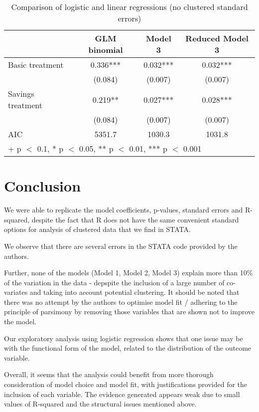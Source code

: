 \documentclass[
]{article}
\begin{document}
\begin{table}

\caption{\label{tab:parsimony}Comparison of logistic and linear regressions (no clustered standard errors)}
\centering
\begin{tabular}[t]{lccc}
\toprule
  & GLM binomial & Model 3 & Reduced Model 3\\
\midrule
Basic treatment & \num{0.336}*** & \num{0.032}*** & \num{0.032}***\\
 & (\num{0.084}) & (\num{0.007}) & \vphantom{1} (\num{0.007})\\
Savings treatment & \num{0.219}** & \num{0.027}*** & \num{0.028}***\\
 & (\num{0.084}) & (\num{0.007}) & (\num{0.007})\\
\midrule
AIC & \num{5351.7} & \num{1030.3} & \num{1031.8}\\
\bottomrule
\multicolumn{4}{l}{\rule{0pt}{1em}+ p $<$ 0.1, * p $<$ 0.05, ** p $<$ 0.01, *** p $<$ 0.001}\\
\end{tabular}
\end{table}

\hypertarget{conclusion}{%
\section{Conclusion}\label{conclusion}}

We were able to replicate the model coefficients, p-values, standard
errors and R-squared, despite the fact that R does not have the same
convenient standard options for analysis of clustered data that we find
in STATA.

We observe that there are several errors in the STATA code provided by
the authors.

Further, none of the models (Model 1, Model 2, Model 3) explain more
than 10\% of the variation in the data - depspite the inclusion of a
large number of co-variates and taking into account potential
clustering. It should be noted that there was no attempt by the authors
to optimise model fit / adhering to the principle of parsimony by
removing those variables that are shown not to improve the model.

Our exploratory analysis using logistic regression shows that one issue
may be with the functional form of the model, related to the
distribution of the outcome variable.

Overall, it seems that the analysis could benefit from more thorough
consideration of model choice and model fit, with justifications
provided for the inclusion of each variable. The evidence generated
appears weak due to small values of R-squared and the structural issues
mentioned above.
\end{document}
